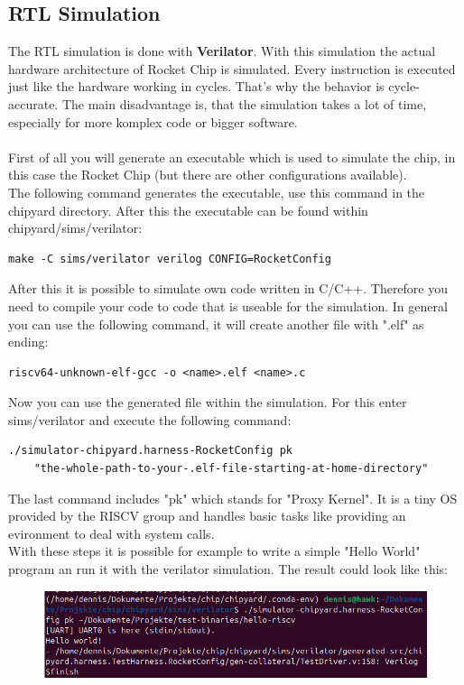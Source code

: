 \documentclass{article}
\begin{document}
{\subsection*{RTL Simulation}
The RTL simulation is done with \textbf{Verilator}. With this simulation the actual hardware architecture
of Rocket Chip is simulated. Every instruction is executed just like the hardware working in cycles. 
That's why the behavior is cycle-accurate. The main disadvantage is, that the simulation takes a lot of time, 
especially for more komplex code or bigger software.\\\\
First of all you will generate an executable which is used to simulate the chip, in this case the Rocket Chip (but there are other configurations available).\\
The following command generates the executable, use this command in the chipyard directory. After this the executable can be found 
within chipyard/sims/verilator:
\begin{verbatim}make -C sims/verilator verilog CONFIG=RocketConfig\end{verbatim}
After this it is possible to simulate own code written in C/C++. Therefore you need to compile 
your code to code that is useable for the simulation. In general you can use the following command, it will create another 
file with ".elf" as ending:
\begin{verbatim}riscv64-unknown-elf-gcc -o <name>.elf <name>.c\end{verbatim}
Now you can use the generated file within the simulation. For this enter sims/verilator and execute 
the following command:\\
\begin{verbatim}./simulator-chipyard.harness-RocketConfig pk  
    "the-whole-path-to-your-.elf-file-starting-at-home-directory"\end{verbatim}
The last command includes "pk" which stands for "Proxy Kernel". It is a tiny OS provided by the RISCV group and handles basic tasks like providing an 
evironment to deal with system calls.\\
With these steps it is possible for example to write a simple "Hello World" program an run it with the verilator simulation. The result could look like this:\\
\begin{figure}[h]
    \centering
    \includegraphics[scale=0.4]{testSuccess.png}

\end{figure}}
\end{document}
